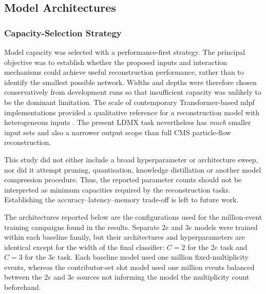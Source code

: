 

















\subsection{Model Architectures}
\label{sec:method_models}


\subsubsection{Capacity-Selection Strategy}
\label{sec:method_capacity_selection}

Model capacity was selected with a performance-first strategy. The principal
objective was to establish whether the proposed inputs and interaction
mechanisms could achieve useful reconstruction performance, rather than to
identify the smallest possible network. Widths and depths were therefore
chosen conservatively from development runs so that insufficient capacity was
unlikely to be the dominant limitation. The scale of contemporary
Transformer-based \gls{mlpf} implementations provided a qualitative reference
for a reconstruction model with heterogeneous inputs
\cite{pata2026-mlpf}. The present LDMX task nevertheless has \emph{much} smaller input
sets and also a narrower output scope than full CMS particle-flow reconstruction.

This study did not either include a broad hyperparameter or architecture sweep, nor
did it attempt pruning, quantisation, knowledge distillation or another model
compression procedure. Thus, the reported parameter counts should not be interpreted as
minimum capacities required by the reconstruction tasks. Establishing the
accuracy--latency--memory trade-off is left to future work.

The architectures reported below are the configurations used for the
million-event training campaigns found in the results. Separate \(2e\) and \(3e\) models were
trained within each baseline family, but their architectures and
hyperparameters are identical except for the width of the final classifier:
\(C=2\) for the \(2e\) task and \(C=3\) for the \(3e\) task. Each baseline model used one million
fixed-multiplicity events, whereas the contributor-set slot model used one
million events balanced between the \(2e\) and \(3e\) sources not informing the model the multiplicity count beforehand.



